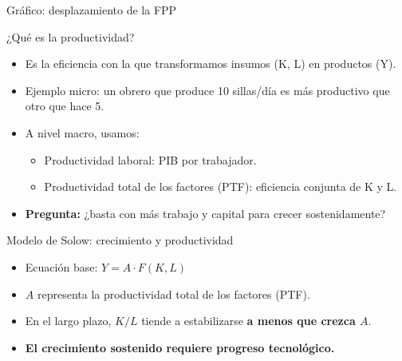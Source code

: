 \documentclass{beamer}
\begin{document}
\begin{frame}{Gráfico: desplazamiento de la FPP}
    \begin{center}
    \end{center}
\end{frame}

\begin{frame}{¿Qué es la productividad?}
    \begin{itemize}
        \item Es la eficiencia con la que transformamos insumos (K, L) en productos (Y).
        \item Ejemplo micro: un obrero que produce 10 sillas/día es más productivo que otro que hace 5.
        \item A nivel macro, usamos:
        \begin{itemize}
            \item Productividad laboral: PIB por trabajador.
            \item Productividad total de los factores (PTF): eficiencia conjunta de K y L.
        \end{itemize}
        \item \textbf{Pregunta:} ¿basta con más trabajo y capital para crecer sostenidamente?
    \end{itemize}
\end{frame}

\begin{frame}{Modelo de Solow: crecimiento y productividad}
    \begin{itemize}
        \item Ecuación base: $Y = A \cdot F(K, L)$
        \item $A$ representa la productividad total de los factores (PTF).
        \item En el largo plazo, $K/L$ tiende a estabilizarse \textbf{a menos que crezca $A$}.
        \item \textbf{El crecimiento sostenido requiere progreso tecnológico.}
    \end{itemize}
\end{frame}
\end{document}
